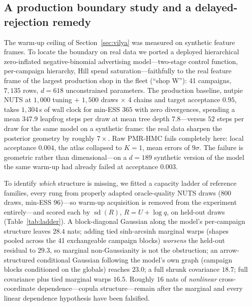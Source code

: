 \documentclass[11pt]{article}
\theoremstyle{remark}
\begin{document}
\subsection{A production boundary study and a delayed-rejection
remedy}\label{sec:boundary}
The warm-up ceiling of Section~\ref{sec:vilya} was measured on
synthetic feature frames. To locate the boundary on real data we
ported a deployed hierarchical zero-inflated negative-binomial
advertising model---two-stage control function, per-campaign
hierarchy, Hill spend saturation---faithfully to the real feature
frame of the largest production shop in the fleet (``shop W''): 41
campaigns, $7{,}135$ rows, $d{=}618$ unconstrained parameters. The
production baseline, nutpie NUTS at $1{,}000$ tuning $+$ $1{,}500$
draws $\times$ 4 chains and target acceptance $0.95$, takes
$1{,}304$\,s of wall clock for min-ESS $365$ with zero divergences,
spending a mean $347.9$ leapfrog steps per draw at mean tree depth
$7.8$---versus $52$ steps per draw for the same model on a synthetic
frame: the real data sharpen the posterior geometry by roughly
$7\times$. Raw PMR-HMC fails completely here: local acceptance
$0.004$, the atlas collapsed to $K{=}1$, mean errors of $9\sigma$.
The failure is geometric rather than dimensional---on a $d{=}189$
synthetic version of the model the same warm-up had already failed at
acceptance $0.003$.

To identify \emph{which} structure is missing, we fitted a capacity
ladder of reference families, every rung from properly adapted
oracle-quality NUTS draws ($800$ draws, min-ESS $96$)---so warm-up
acquisition is removed from the experiment entirely---and scored each
by $\operatorname{sd}(R)$, $R=U+\log q$, on held-out draws
(Table~\ref{tab:ladder}). A block-diagonal Gaussian along the model's
per-campaign structure leaves $28.4$ nats; adding tied sinh-arcsinh
marginal warps (shapes pooled across the 41 exchangeable campaign
blocks) \emph{worsens} the held-out residual to $29.3$, so marginal
non-Gaussianity is not the obstruction; an arrow-structured
conditional Gaussian following the model's own graph (campaign blocks
conditioned on the globals) reaches $23.0$; a full shrunk covariance
$18.7$; full covariance plus tied marginal warps $16.5$. Roughly
$16$ nats of \emph{nonlinear} cross-coordinate dependence---copula
structure---remain after the marginal and every linear dependence
hypothesis have been falsified.
\end{document}
